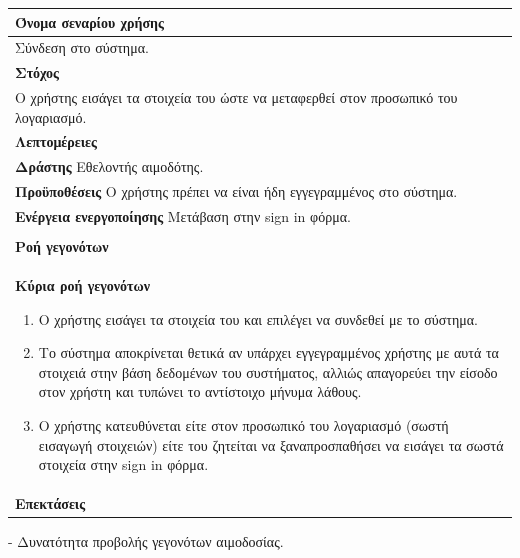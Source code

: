 	\begin{center}
    \begin{tabular}{|p{\dimexpr \linewidth-2\tabcolsep}|}
    \hline
    \rowcolor{grayy}
    \textbf{Όνομα σεναρίου χρήσης}
    \\ \hline    
    Σύνδεση στο σύστημα.
     \\ \hline
    \rowcolor{grayy}
    \textbf{\textbf{Στόχος}}
    \\ \hline
        Ο χρήστης εισάγει τα στοιχεία του ώστε να μεταφερθεί στον προσωπικό του λογαριασμό.
    \\ \hline
    \rowcolor{grayy}
    \textbf{Λεπτομέρειες}
    \\ \hline
	\textbf{Δράστης} Εθελοντής αιμοδότης.
	\\*
	\textbf{Προϋποθέσεις} Ο χρήστης πρέπει να είναι ήδη εγγεγραμμένος στο σύστημα.
	\\*
	\textbf{Ενέργεια ενεργοποίησης} Μετάβαση στην sign in φόρμα.
	\\ \hline
    \\ \hline
	\rowcolor{grayy}    
    \textbf{Ροή γεγονότων}
    \\* 
	\textbf{Κύρια ροή γεγονότων}
	\begin{enumerate}
	\item	Ο χρήστης εισάγει τα στοιχεία του και επιλέγει να συνδεθεί με το σύστημα.
	\item Το σύστημα αποκρίνεται θετικά αν υπάρχει εγγεγραμμένος  χρήστης με αυτά τα στοιχειά στην βάση δεδομένων του συστήματος, αλλιώς απαγορεύει
την είσοδο στον χρήστη και τυπώνει το αντίστοιχο μήνυμα λάθους.
	\item	Ο χρήστης κατευθύνεται είτε στον προσωπικό του λογαριασμό (σωστή εισαγωγή στοιχειών) είτε του ζητείται να ξαναπροσπαθήσει να εισάγει τα σωστά στοιχεία στην sign in φόρμα.
	\end{enumerate}
	\\*
	\textbf{Επεκτάσεις}
	   \\ \hline
    \end{tabular}
\end{center}

-	Δυνατότητα προβολής γεγονότων αιμοδοσίας.
	
